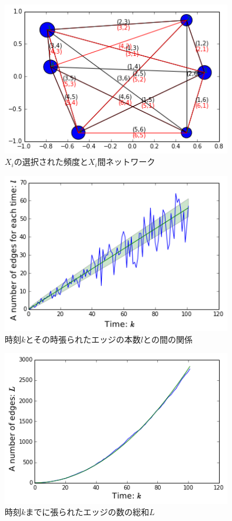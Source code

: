 \begin{figure}[H]
    \begin{center}
        \includegraphics[width=10cm]{../download2_2.png}
        \caption{$X_{i}$の選択された頻度と$X_{i}$間ネットワーク}
        \label{fig:f4}
    \end{center}
\end{figure}
\begin{figure}[H]
    \begin{center}
        \includegraphics[width=10cm]{../download2_3.png}
        \caption{時刻$k$とその時張られたエッジの本数$l$との間の関係}
        \label{fig:f5}
    \end{center}
\end{figure}
\begin{figure}[H]
    \begin{center}
        \includegraphics[width=10cm]{../download2_4.png}
        \caption{時刻$k$までに張られたエッジの数の総和$L$}
        \label{fig:f6}
    \end{center}
\end{figure}

